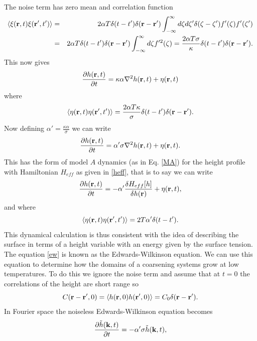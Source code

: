The noise term has zero mean and correlation function
\begin{eqnarray}
\langle \xi({\bf r},t)\xi({\bf r}',t')\rangle &=&2\alpha T\delta(t-t')\delta({\bf r}-{\bf r}')\int_{-\infty}^\infty d\zeta d\zeta' \delta(\zeta-\zeta')f'(\zeta)f'(\zeta')\\
&=& 2\alpha T\delta(t-t')\delta({\bf r}-{\bf r}')\int_{-\infty}^\infty d\zeta f'^2(\zeta)= \frac{2\alpha T\sigma}{\kappa}\delta(t-t')\delta({\bf r}-{\bf r}').
\end{eqnarray}
This now gives
\begin{equation}
\frac{\partial h({\bf r},t)}{\partial t}= \kappa\alpha \nabla^2 h({\bf r},t) + \eta({\bf r},t)
\end{equation}
where 
\begin{equation}
\langle \eta({\bf r},t)\eta({\bf r}',t')\rangle = \frac{2\alpha T\kappa}{\sigma}\delta(t-t')\delta({\bf r}-{\bf r}').
\end{equation}
Now defining $\alpha' = \frac{\kappa\alpha}{\sigma}$ we can write
\begin{equation}
\frac{\partial h({\bf r},t)}{\partial t}= \alpha' \sigma\nabla^2 h({\bf r},t) + \eta({\bf r},t).
\end{equation}
This has the form of model $A$ dynamics (as in Eq. \eqref{MA})  for the height profile with Hamiltonian
$H_{eff}$ as given in \eqref{heff}, that is to say we can write
\begin{equation}
\frac{\partial h({\bf r},t)}{\partial t}= -\alpha' \frac{\delta H_{eff}[h]}{\delta h({\bf r})} + \eta({\bf r},t),
\label{ew}
\end{equation}
and where 
\begin{equation}
\langle \eta({\bf r},t)\eta({\bf r}',t')\rangle= 2T\alpha'\delta(t-t').
\end{equation}
This dynamical calculation is thus consistent with the idea of describing the surface in terms of a height variable with an energy given by the surface tension. The equation \eqref{ew} is known as the Edwards-Wilkinson equation. We can use this equation to determine how the domains of a coarsening systems grow at low temperatures. To do this we ignore the noise term and assume that at $t=0$ the correlations of the height are short range so
\begin{equation}
C({\bf r}-{\bf r}',0)= \langle h({\bf r},0)h({\bf r}',0)\rangle =C_0 \delta({\bf r}-{\bf r}').
\end{equation}
In Fourier space the noiseless Edwards-Wilkinson equation becomes
\begin{equation}
\frac{\partial\tilde h({\bf k},t)}{\partial t} = -\alpha'\sigma \tilde h({\bf k},t) ,
\end{equation}

